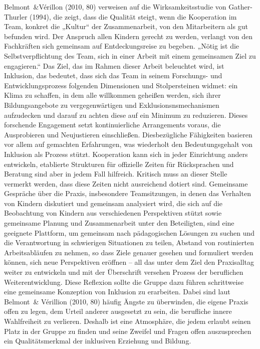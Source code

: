 Belmont~\&Vérillon (2010, 80) verweisen auf die Wirksamkeitsstudie von Gather-Thurler (1994), die zeigt, dass die Qualität steigt, wenn die Kooperation im Team, konkret die „Kultur“ der Zusammenarbeit, von den Mitarbeitern als gut befunden wird.  
Der Anspruch allen Kindern gerecht zu werden, verlangt von den Fachkräften sich gemeinsam auf Entdeckungsreise zu begeben. „Nötig ist die Selbstverpflichtung des Team, sich in einer Arbeit mit einem gemeinsamen Ziel zu engagieren.“ Das Ziel, das im Rahmen dieser Arbeit beleuchtet wird, ist Inklusion, das bedeutet, dass sich das Team in seinem Forschungs- und Entwicklungsprozess folgenden Dimensionen und Stolpersteinen widmet: 
ein Klima zu schaffen, in dem alle willkommen geheißen werden, sich ihrer Bildungsangebote zu vergegenwärtigen und Exklusionsnsmechanismen aufzudecken und darauf zu achten diese auf ein Minimum zu reduzieren.
Dieses forschende Engagement setzt kontinuierliche Arrangements voraus, die Ausprobieren und Neujustieren einschließen. Diesbezügliche Fähigkeiten basieren vor allem auf gemachten Erfahrungen, was wiederholt den Bedeutungsgehalt von Inklusion als Prozess stützt. 
Kooperation kann sich in jeder Einrichtung anders entwickeln, etablierte Strukturen für offizielle Zeiten für Rücksprachen und Beratung sind aber in jedem Fall hilfreich. Kritisch muss an dieser Stelle vermerkt werden, dass diese Zeiten nicht ausreichend dotiert sind.
Gemeinsame Gespräche über die Praxis, insbesondere Teamsitzungen, in denen das Verhalten von Kindern diskutiert und gemeinsam analysiert wird, die sich auf die Beobachtung von Kindern aus verschiedenen Perspektiven stützt sowie gemeinsame Planung und Zusammenarbeit unter den Beteiligten, sind eine geeignete Plattform, um gemeinsam nach pädagogischen Lösungen zu suchen und die Verantwortung in schwierigen Situationen zu teilen, Abstand von routinierten Arbeitsabläufen zu nehmen, so dass Ziele genauer gesehen und formuliert werden können, sich neue Perspektiven eröffnen – all das unter dem Ziel den Praxisalltag weiter zu entwickeln und mit der Überschrift versehen Prozess der beruflichen Weiterentwicklung.
Diese Reflexion sollte die Gruppe dazu führen schrittweise eine gemeinsame Konzeption von Inklusion zu erarbeiten.
Dabei sind laut Belmont~\& Vérillion (2010, 80) häufig Ängste zu überwinden, die eigene Praxis offen zu legen, dem Urteil anderer ausgesetzt zu sein, die berufliche innere Wahlfreiheit zu verlieren. Deshalb ist eine Atmosphäre, die jedem erlaubt seinen Platz in der Gruppe zu finden und seine Zweifel und Fragen offen auszusprechen ein Qualitätsmerkmal der inklusiven Erziehung und Bildung.

